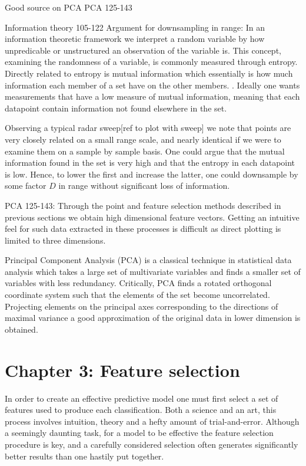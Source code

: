 \documentclass[a4paper, 12pt]{article}
\begin{document}
Good source on PCA
\cite{hyvasrinen_karhunen_oja_2004}
PCA 125-143

Information theory
105-122
Argument for downsampling in range: In an information theoretic framework we interpret a random variable by how unpredicable or unstructured an observation of the variable is. This concept, examining the randomness of a variable, is commonly measured through entropy. Directly related to entropy is mutual information which essentially is how much information each member of a set have on the other members. \cite{hyvasrinen_karhunen_oja_2004}. Ideally one wants measurements that have a low measure of mutual information, meaning that each datapoint contain information not found elsewhere in the set. 

Observing a typical radar sweep[ref to plot with sweep] we note that points are very closely related on a small range scale, and nearly identical if we were to examine them on a sample by sample basis. One could argue that the mutual information found in the set is very high and that the entropy in each datapoint is low. Hence, to lower the first and increase the latter, one could downsample by some factor $D$ in range without significant loss of information.


PCA 125-143: Through the point and feature selection methods described in previous sections we obtain high dimensional feature vectors. Getting an intuitive feel for such data extracted in these processes is difficult as direct plotting is limited to three dimensions. 

Principal Component Analysis (PCA) is  a classical technique in statistical data analysis which takes a large set of multivariate variables and finds a smaller set of variables with less redundancy. Critically, PCA finds a rotated orthogonal coordinate system such that the elements of the set become uncorrelated. Projecting elements on the principal axes corresponding to the directions of maximal variance a good approximation of the original data in lower dimension is obtained\citep{hyvasrinen_karhunen_oja_2004}. 

\section{Chapter 3: Feature selection}

In order to create an effective predictive model one must first select a set of features used to produce each classification. Both a science and an art, this process involves intuition, theory and a hefty amount of trial-and-error. Although a seemingly daunting task, for a model to be effective the feature selection procedure is key, and a carefully considered selection often generates significantly better results than one hastily put together. 
\end{document}

